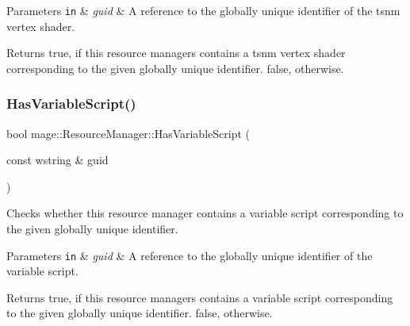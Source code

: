 \begin{DoxyParams}[1]{Parameters}
\mbox{\tt in}  & {\em guid} & A reference to the globally unique identifier of the tsnm vertex shader. \\
\hline
\end{DoxyParams}
\begin{DoxyReturn}{Returns}
{\ttfamily true}, if this resource managers contains a tsnm vertex shader corresponding to the given globally unique identifier. {\ttfamily false}, otherwise. 
\end{DoxyReturn}
\hypertarget{classmage_1_1_resource_manager_a34d72d4729102af23d73438eea629e02}{}\label{classmage_1_1_resource_manager_a34d72d4729102af23d73438eea629e02} 
\subsubsection{\texorpdfstring{Has\+Variable\+Script()}{HasVariableScript()}}
{\footnotesize\ttfamily bool mage\+::\+Resource\+Manager\+::\+Has\+Variable\+Script (\begin{DoxyParamCaption}\item[{const wstring \&}]{guid }\end{DoxyParamCaption})\hspace{0.3cm}{\ttfamily [noexcept]}}

Checks whether this resource manager contains a variable script corresponding to the given globally unique identifier.


\begin{DoxyParams}[1]{Parameters}
\mbox{\tt in}  & {\em guid} & A reference to the globally unique identifier of the variable script. \\
\hline
\end{DoxyParams}
\begin{DoxyReturn}{Returns}
{\ttfamily true}, if this resource managers contains a variable script corresponding to the given globally unique identifier. {\ttfamily false}, otherwise. 
\end{DoxyReturn}
\hypertarget{classmage_1_1_resource_manager_a20dccd5bdf541990ec4db7819adc6cdb}{}\label{classmage_1_1_resource_manager_a20dccd5bdf541990ec4db7819adc6cdb} 
